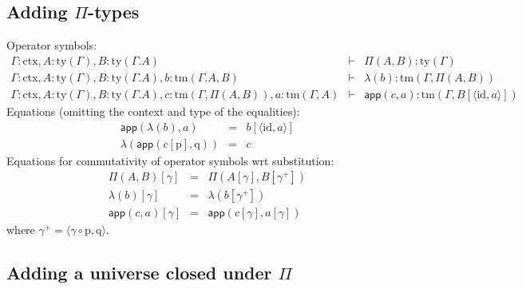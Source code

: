 \documentclass[11pt,a4paper]{article}
\theoremstyle{definition}
\newcommand{\id}{\mathsf{id}}
\newcommand{\app}[2]{{#1\,#2}} %
\def\id{\mathrm{id}}
\newcommand{\ctx}{\mathrm{ctx}}
\newcommand{\ty}{\mathrm{ty}}
\newcommand{\tm}{\mathrm{tm}}
\newcommand{\tuple}[1]{\langle #1 \rangle}
\def\p{\mathrm{p}}
\def\q{\mathrm{q}}
\def\app{\mathsf{app}}
\begin{document}
\subsection{Adding $\Pi$-types}
\begin{tiny}
Operator symbols:
\begin{eqnarray*}
\Gamma : \ctx, A : \ty(\Gamma), B : \ty(\Gamma.A)&\vdash& \Pi(A,B) : \ty(\Gamma)\\
\Gamma : \ctx, A : \ty(\Gamma), B : \ty(\Gamma.A), b : \tm(\Gamma.A, B) &\vdash& \lambda(b) : \tm(\Gamma,\Pi(A,B))\\
\Gamma : \ctx, A : \ty(\Gamma), B : \ty(\Gamma.A), c :  \tm(\Gamma,\Pi(A,B)), a : \tm(\Gamma, A) &\vdash& \app(c,a) : \tm(\Gamma, B[\tuple{\id,a}])
\end{eqnarray*}
Equations (omitting the context and type of the equalities):
 \begin{eqnarray*}
 \app(\lambda(b),a) &=& b[\tuple{\id,a}]\\
 \lambda(\app(c[\p],\q)) &=& c
 \end{eqnarray*}
 Equations for commutativity of operator symbols wrt substitution:
 \begin{eqnarray*}
\Pi(A,B)[ \gamma ] &=& \Pi(A [ \gamma ], B[ \gamma^+ ])\\
\lambda(b) [ \gamma ] &=& \lambda(b[\gamma^+ ])\\
\app(c,a) [ \gamma ] &=& \app(c[ \gamma ], a[ \gamma ] )
\end{eqnarray*}
where $\gamma^+ = \tuple{\gamma \circ \p, \q}$.
\end{tiny}


\subsection{Adding a universe closed under $\Pi$}
\end{document}
